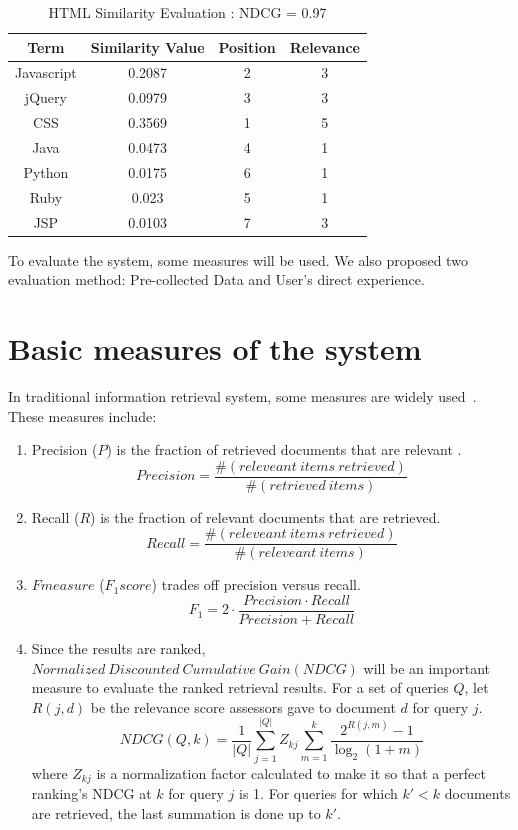 \begin{table}
\centering
\caption{ HTML Similarity Evaluation : NDCG = 0.97 }
\begin{tabular}{ | c | c | c  | c |  }
 \hline
    Term      &  Similarity Value  &  Position   & Relevance     \\  \hline
  Javascript   &  0.2087           &      2      &   3        \\
     jQuery    &  0.0979           &      3      &   3         \\
     CSS     &  0.3569             &      1      &   5   \\
     Java    &  0.0473             &      4      &   1   \\
    Python   &  0.0175             &      6      &   1   \\
     Ruby    &  0.023              &      5      &   1    \\
     JSP     &  0.0103             &      7      &   3    \\
 \hline
\end{tabular}
\label{tab:simcompare2}
\end{table}

  

To evaluate the system, some measures will be used. We also proposed two evaluation method: Pre-collected Data and User's direct experience.

\section{Basic measures of the system}

In traditional information retrieval system, some measures are widely used~\cite{manning2008introduction}. These measures include:

\begin{enumerate}
    \item Precision ($P$) is the fraction of retrieved documents that are relevant .
       $$  Precision =  \frac{ \#(releveant~items~ retrieved)}{ \#(retrieved~items)}$$
    \item Recall ($R$) is the fraction of relevant documents that are retrieved.
       $$  Recall =  \frac{ \#(releveant~items~ retrieved)}{ \#(releveant~items)}$$
    \item $F measure$ ($F_1 score$) trades off precision versus recall.
       $$ F_1 = 2 \cdot \frac{ Precision \cdot Recall}{ Precision + Recall } $$
    \item Since the results are ranked, $ Normalized~Discounted~Cumulative~Gain ( NDCG )$ will be an important measure to evaluate the ranked retrieval results. For a set of queries $Q$, let $R(j,d)$ be the relevance score assessors gave to document $d$ for query $j$.
       $$ NDCG(Q,k) = \frac {1}{|Q|} \sum_{j=1}^{|Q|}{Z_{kj}} \sum_{m=1}^{k} \frac{2^{R(j,m)} - 1}{ \log_2(1+m)} $$
where $Z_{kj}$ is a normalization factor calculated to make it so that a perfect ranking's NDCG at $k$ for query $j$ is 1. For queries for which $k' < k$ documents are retrieved, the last summation is done up to $k'$.

\end{enumerate}

